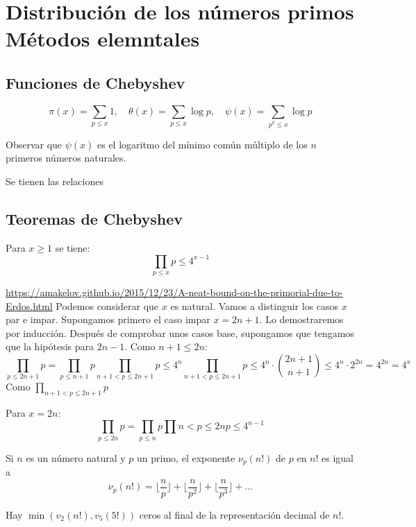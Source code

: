 \documentclass[TAN.tex]{subfiles}
\begin{document}
\chapter{Distribución de los números primos\\Métodos elemntales}

\section{Funciones de Chebyshev}
\begin{nota}
\[ π(x)=\sum_{p≤x} 1, \quad θ(x) = \sum_{p≤x} \log p, \quad ψ(x)=\sum_{p^k≤x} \log p \]
\end{nota}
Observar que $ψ(x)$ es el logaritmo del mínimo común múltiplo de los $n$ primeros números naturales.

\begin{prop} Se tienen las relaciones
\end{prop}

\section{Teoremas de Chebyshev}
\begin{teorema}
Para $x ≥ 1$ se tiene:
\[ \prod_{p≤x} p ≤ 4^{x-1} \]
\end{teorema}
\begin{dem}
\url{https://amakelov.github.io/2015/12/23/A-neat-bound-on-the-primorial-due-to-Erdos.html}
Podemos considerar que $x$ es natural. Vamos a distinguir los casos $x$ par e impar. Supongamos primero el caso impar $x=2n+1$. Lo demostraremos por inducción. Después de comprobar unos casos base, supongamos que tengamos que la hipótesis para $2n-1$. Como $n+1≤2n$:
\[ \prod_{p≤2n+1} p = \prod_{p≤n+1} p \prod_{n+1<p≤2n+1} p ≤ 4^n \prod_{n+1<p≤2n+1} p ≤ 4^n \cdot \binom{2n+1}{n+1}≤ 4^n\cdot 2^{2n}=4^{2n}=4^x \]
Como $\prod_{n+1<p≤2n+1} p $

Para $x=2n$:
\[ \prod_{p≤2n} p = \prod_{p≤n} p \prod {n<p≤2n}p ≤ 4^{n-1}\]
\end{dem}

\begin{teorema}[Legendre]
Si $n$ es un número natural y $p$ un primo, el exponente $ν_p(n!)$ de $p$ en $n!$ es igual a
\[ ν_p(n!) = \lfloor \frac{n}{p}\rfloor + \lfloor \frac{n}{p^2}\rfloor + \lfloor \frac{n}{p^3}\rfloor + \dots \]
\end{teorema}

\begin{coro}
Hay $\min(v_2(n!),v_5(5!))$ ceros al final de la representación decimal de $n!$.
\end{coro}
\end{document}
